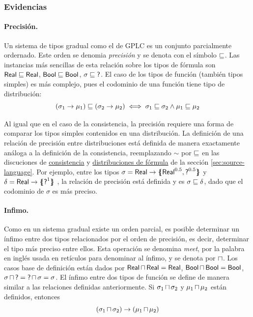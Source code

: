 \subsubsection{Evidencias}\label{sec:evidence}

\paragraph{Precisión.}\label{par:precision} Un sistema de tipos gradual como el de GPLC es un conjunto parcialmente ordernado. Este orden se denomia \emph{precisión} y se denota con el símbolo $\sqsubseteq$. Las instancias más sencillas de esta relación sobre los tipos de fórmula son $\mathord{\text{\sffamily Real}} \sqsubseteq \mathord{\text{\sffamily Real}}$, $\mathord{\text{\sffamily Bool}} \sqsubseteq \mathord{\text{\sffamily Bool}}$, $\sigma\sqsubseteq\mathord{\text{\sffamily ?}}$. El caso de los tipos de función (también tipos simples) es más complejo, pues el codominio de una función tiene tipo de distribución:
\[
  (\sigma_1 \to \mu_1) \sqsubseteq (\sigma_2 \to \mu_2) \iff
  \sigma_1 \sqsubseteq \sigma_2 \land \mu_1 \sqsubseteq \mu_2
\]

Al igual que en el caso de la consistencia, la precisión requiere una forma de comparar los tipos simples contenidos en una distribución. La definición de una relación de precisión entre distribuciones está definida de manera exactamente análoga a la definición de la consistencia, reemplazando $\sim$ por $\sqsubseteq$ en las discuciones de \hyperref[par:consistency]{consistencia} y \hyperref[par:symbolic]{distribuciones de fórmula} de la sección \ref{sec:source-language}. Por ejemplo, entre los tipos $\sigma = \mathord{\text{\sffamily Real}} \to \{\mskip-7mu\{ {\mathord{\text{\sffamily Real}}^{0.5},\mathord{\text{\sffamily ?}}^{0.5}} \}\mskip-7mu\}$  y $\delta = \mathord{\text{\sffamily Real}} \to \{\mskip-7mu\{ {\mathord{\text{\sffamily ?}}^1} \}\mskip-7mu\}$ , la relación de precisión está definida y es $\sigma\sqsubseteq\delta$, dado que el codominio de $\sigma$ es más preciso.

\paragraph{Infimo.} Como en un sistema gradual existe un orden
parcial, es posible determinar un ínfimo entre dos tipos relacionados
por el orden de precisión, es decir, determinar el tipo más preciso
entre ellos. Esta operación se denomina \emph{meet}, por la palabra en
inglés usada en retículos para denominar al ínfimo, y se denota por
$\mathop{\sqcap}$.  Los casos base de definición están dados por $\mathord{\text{\sffamily Real}} \mathop{\sqcap} \mathord{\text{\sffamily Real}} = \mathord{\text{\sffamily Real}}$, $\mathord{\text{\sffamily Bool}} \mathop{\sqcap} \mathord{\text{\sffamily Bool}} = \mathord{\text{\sffamily Bool}}$, $\sigma \mathop{\sqcap} \mathord{\text{\sffamily ?}} = \mathord{\text{\sffamily ?}} \mathop{\sqcap} \sigma = \sigma$. El ínfimo entre dos tipos de función se define de manera similar a las relaciones definidas anteriormente. Si $\sigma_1\mathop{\sqcap}\sigma_2$ y $\mu_1 \mathop{\sqcap} \mu_2$ están definidos, entonces \[(\sigma_1\mathop{\sqcap}\sigma_2) \to (\mu_1 \mathop{\sqcap} \mu_2)\]

